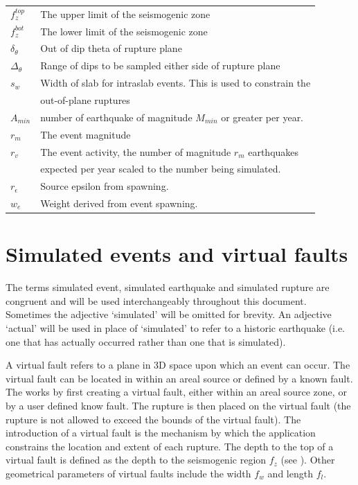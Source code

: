 \begin{table}
\begin{tabular}{l |  l}
$f_z^{top}$ & The upper limit of the seismogenic zone \\
$f_z^{bot}$ & The lower limit of the seismogenic zone \\ 
$\delta_\theta$ & Out of dip theta of rupture plane \\
$\Delta_\theta$ & Range of dips to be sampled either side of rupture plane \\
$s_w$ & Width of slab for intraslab events. This is used to constrain the \\
& out-of-plane ruptures \\
$A_{min}$ & number of earthquake of magnitude $M_{min}$ or greater per year. \\
$r_m$ & The event magnitude  \\ 
$r_v$ & The event activity, the number of magnitude $r_m$ earthquakes \\
& expected per year scaled to the number being simulated. \\
$r_\epsilon$ & Source epsilon from spawning. \\
$w_e$ & Weight derived from event spawning. \\
\hline
\end{tabular}
\end{table}


\section{Simulated events and virtual faults}

The terms simulated event, simulated
earthquake and simulated
rupture are congruent and will be used
interchangeably throughout this document. Sometimes the adjective
`simulated' will be omitted for brevity. An adjective `actual'
will be used in place of `simulated' to refer to a historic
earthquake (i.e. one that has actually occurred rather than one
that is simulated).

A virtual fault refers to a plane in 3D space upon which an event can
occur.  The virtual fault can be located in within an areal source or defined by a known fault. 
The  works by first creating a virtual fault, either within an
areal source zone, or by a user defined know fault. The rupture is then placed 
on the virtual fault (the
rupture is not allowed to exceed the bounds of the virtual
fault). The introduction of a virtual
fault is the mechanism by which the
 application constrains the location and extent
of each rupture. The depth to the top of a virtual
fault is defined as the depth to the
seismogenic region $f_z$ (see
). Other geometrical parameters
of virtual faults include the width $f_w$ and
length $f_l$. 


